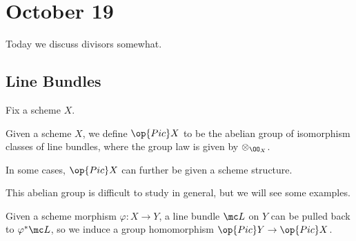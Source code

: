 \documentclass[../notes.tex]{subfiles}
\begin{document}
\section{October 19}

Today we discuss divisors somewhat.

\subsection{Line Bundles}
Fix a scheme $X$.
\begin{notation}
	Given a scheme $X$, we define $\op{Pic}X$ to be the abelian group of isomorphism classes of line bundles, where the group law is given by $\otimes_{\OO_X}$.
\end{notation}
\begin{remark}
	In some cases, $\op{Pic}X$ can further be given a scheme structure.
\end{remark}
This abelian group is difficult to study in general, but we will see some examples.
\begin{remark}
	Given a scheme morphism $\varphi\colon X\to Y$, a line bundle $\mc L$ on $Y$ can be pulled back to $\varphi^*\mc L$, so we induce a group homomorphism $\op{Pic}Y\to\op{Pic}X$.
\end{remark}
\end{document}
